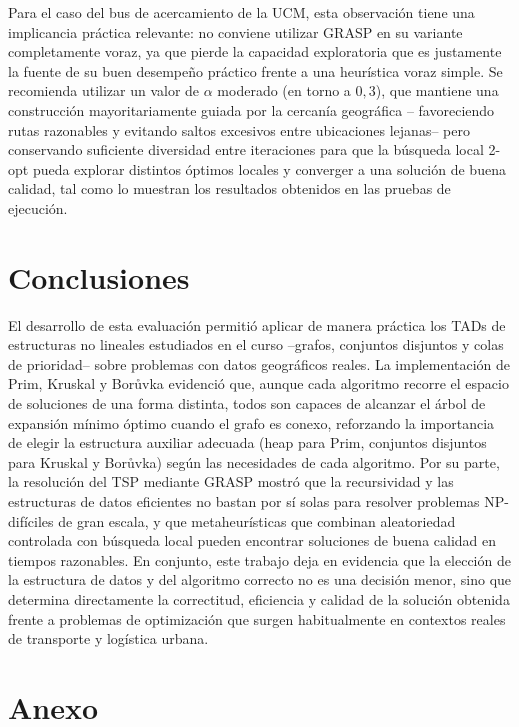 \documentclass[12pt,letterpaper]{article}
\begin{document}
Para el caso del bus de acercamiento de la UCM, esta observación tiene una implicancia práctica
relevante: no conviene utilizar GRASP en su variante completamente voraz, ya que pierde la
capacidad exploratoria que es justamente la fuente de su buen desempeño práctico frente a una
heurística voraz simple. Se recomienda utilizar un valor de $\alpha$ moderado (en torno a
$0{,}3$), que mantiene una construcción mayoritariamente guiada por la cercanía geográfica --
favoreciendo rutas razonables y evitando saltos excesivos entre ubicaciones lejanas-- pero
conservando suficiente diversidad entre iteraciones para que la búsqueda local 2-opt pueda
explorar distintos óptimos locales y converger a una solución de buena calidad, tal como lo
muestran los resultados obtenidos en las pruebas de ejecución.

\section{Conclusiones}

El desarrollo de esta evaluación permitió aplicar de manera práctica los TADs de estructuras no
lineales estudiados en el curso --grafos, conjuntos disjuntos y colas de prioridad-- sobre
problemas con datos geográficos reales. La implementación de Prim, Kruskal y Borůvka evidenció
que, aunque cada algoritmo recorre el espacio de soluciones de una forma distinta, todos son
capaces de alcanzar el árbol de expansión mínimo óptimo cuando el grafo es conexo, reforzando la
importancia de elegir la estructura auxiliar adecuada (heap para Prim, conjuntos disjuntos para
Kruskal y Borůvka) según las necesidades de cada algoritmo. Por su parte, la resolución del TSP
mediante GRASP mostró que la recursividad y las estructuras de datos eficientes no bastan por sí
solas para resolver problemas NP-difíciles de gran escala, y que metaheurísticas que combinan
aleatoriedad controlada con búsqueda local pueden encontrar soluciones de buena calidad en tiempos
razonables. En conjunto, este trabajo deja en evidencia que la elección de la estructura de datos
y del algoritmo correcto no es una decisión menor, sino que determina directamente la
correctitud, eficiencia y calidad de la solución obtenida frente a problemas de optimización que
surgen habitualmente en contextos reales de transporte y logística urbana.

\section{Anexo}
\end{document}
